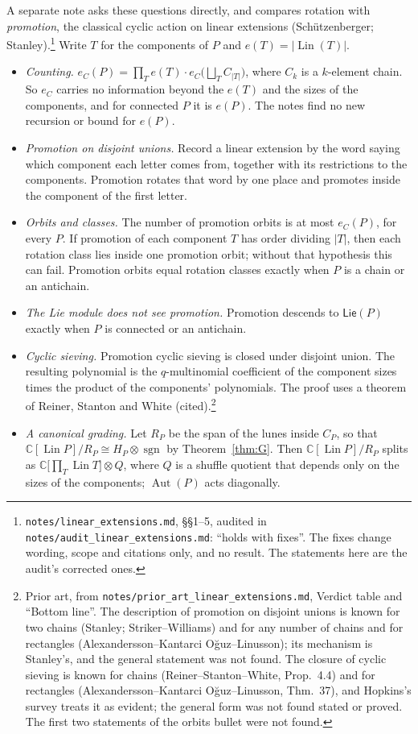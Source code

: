 \documentclass[11pt]{article}
\theoremstyle{definition}
\theoremstyle{remark}
\newcommand{\Lin}{\operatorname{Lin}}
\newcommand{\Aut}{\operatorname{Aut}}
\newcommand{\PLie}{\mathsf{Lie}}
\newcommand{\sgn}{\operatorname{sgn}}
\newcommand{\src}[1]{\nolinkurl{#1}}
\newcommand{\tagbox}[1]{\leavevmode\marginpar{\raggedright\fbox{\parbox{0.66in}{\centering\scriptsize\sffamily #1}}}}
\newcommand{\PROVEN}{\tagbox{PROVEN\\AUDITED}}
\begin{document}
A separate note asks these questions directly, and compares rotation with
\emph{promotion}, the classical cyclic action on linear extensions
(Sch\"utzenberger; Stanley).\footnote{\src{notes/linear_extensions.md},
\S\S1--5, audited in \src{notes/audit_linear_extensions.md}: ``holds with
fixes''. The fixes change wording, scope and citations only, and no result.
The statements here are the audit's corrected ones.}\PROVEN{} Write $T$ for
the components of $P$ and $e(T)=|\Lin(T)|$.
\begin{itemize}
\item \emph{Counting.} $e_C(P)=\prod_Te(T)\cdot
  e_C\bigl(\bigsqcup_TC_{|T|}\bigr)$, where $C_k$ is a $k$-element chain. So
  $e_C$ carries no information beyond the $e(T)$ and the sizes of the
  components, and for connected $P$ it is $e(P)$. The notes find no new
  recursion or bound for $e(P)$.
\item \emph{Promotion on disjoint unions.} Record a linear extension by the
  word saying which component each letter comes from, together with its
  restrictions to the components. Promotion rotates that word by one place
  and promotes inside the component of the first letter.
\item \emph{Orbits and classes.} The number of promotion orbits is at most
  $e_C(P)$, for every $P$. If promotion of each component $T$ has order
  dividing $|T|$, then each rotation class lies inside one promotion orbit;
  without that hypothesis this can fail. Promotion orbits equal rotation
  classes exactly when $P$ is a chain or an antichain.
\item \emph{The Lie module does not see promotion.} Promotion descends to
  $\PLie(P)$ exactly when $P$ is connected or an antichain.
\item \emph{Cyclic sieving.} Promotion cyclic sieving is closed under
  disjoint union. The resulting polynomial is the $q$-multinomial coefficient
  of the component sizes times the product of the components' polynomials.
  The proof uses a theorem of Reiner, Stanton and White
  (cited).\footnote{Prior art, from
  \src{notes/prior_art_linear_extensions.md}, Verdict table and ``Bottom
  line''. The description of promotion on disjoint unions is known for two
  chains (Stanley; Striker--Williams) and for any number of chains and for
  rectangles (Alexandersson--Kantarci O\u{g}uz--Linusson); its mechanism is
  Stanley's, and the general statement was not found. The closure of cyclic
  sieving is known for chains (Reiner--Stanton--White, Prop.~4.4) and for
  rectangles (Alexandersson--Kantarci O\u{g}uz--Linusson, Thm.~37), and
  Hopkins's survey treats it as evident; the general form was not found
  stated or proved. The first two statements of the orbits bullet were not
  found.}
\item \emph{A canonical grading.} Let $R_P$ be the span of the lunes
  inside $C_P$, so that $\mathbb C[\Lin P]/R_P\cong H_P\otimes\sgn$ by
  Theorem~\ref{thm:G}. Then $\mathbb C[\Lin P]/R_P$ splits as
  $\mathbb C\bigl[\prod_T\Lin T\bigr]\otimes Q$, where $Q$ is a shuffle
  quotient that depends only on the sizes of the components; $\Aut(P)$ acts
  diagonally.
\end{itemize}
\end{document}
